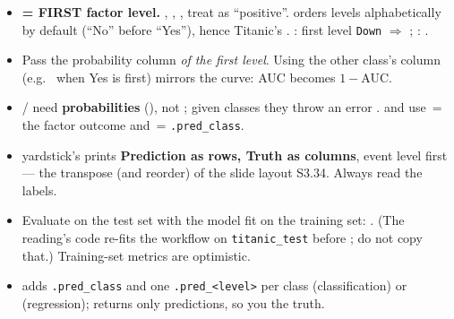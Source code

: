 \begin{trap}
\begin{itemize}
\item \textbf{ = FIRST factor level.} , ,
  ,  treat  as ``positive''.  orders levels
  alphabetically by default (``No'' before ``Yes''), hence Titanic's .
  : first level \texttt{Down} $\Rightarrow$ ;
  :  .
\item Pass the probability column \emph{of the first level}. Using the other class's column
  (e.g.\  when Yes is first) mirrors the curve: AUC becomes $1-$AUC.
\item {} /  need \textbf{probabilities} (), not
  ; given classes they throw an error .  and 
  use \,= the factor outcome and \,= \texttt{.pred\_class}.
\item yardstick's  prints \textbf{Prediction as rows, Truth as columns}, event level first --- the
  transpose (and reorder) of the slide layout S3.34. Always read the labels.
\item Evaluate on the test set with the model fit on the training set:
  . (The reading's code re-fits the workflow on
  \texttt{titanic\_test} before ; do not copy that.) Training-set metrics are optimistic.
\item {} adds \texttt{.pred\_class} and one \texttt{.pred\_<level>} per class (classification) or
   (regression);  returns only predictions, so you  the truth.
\end{itemize}
\end{trap}

